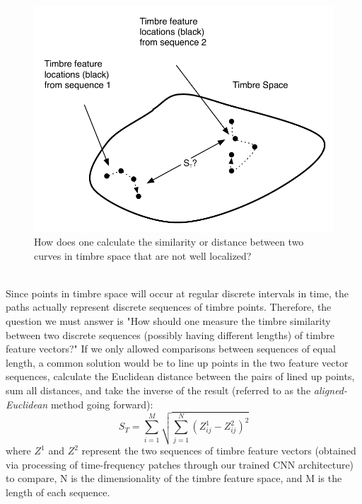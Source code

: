 \documentclass[a4paper,12pt]{report} 	%
\numberwithin{figure}{chapter}
\numberwithin{table}{chapter}
\numberwithin{equation}{chapter}
\begin{document}
\begin{flushleft}
\begin{figure}[h!]
\begin{center}
\includegraphics[scale=0.8]{TimbreDistance2}
\caption[Timbre Distance Between Curves]{How does one calculate the similarity or distance between two curves in timbre space that are not well localized?}
\end{center}
\end{figure}
\\
Since points in timbre space will occur at regular discrete intervals in time, the paths actually represent discrete sequences of timbre points. Therefore, the question we must answer is "How should one measure the timbre similarity between two discrete sequences (possibly having different lengths) of timbre feature vectors?" If we only allowed comparisons between sequences of equal length, a common solution would be to line up points in the two feature vector sequences, calculate the Euclidean distance between the pairs of lined up points, sum all distances, and take the inverse of the result (referred to as the \emph{aligned-Euclidean} method going forward):
\begin{equation}
S_T = \sum_{i=1}^{M}\sqrt{\sum_{j=1}^{N}(Z_{ij}^1 - Z_{ij}^2)^2}
\end{equation}
where $Z^1$ and $Z^2$ represent the two sequences of timbre feature vectors (obtained via processing of time-frequency patches through our trained CNN architecture) to compare, N is the dimensionality of the timbre feature space, and M is the length of each sequence.


\end{flushleft}
\end{document}
